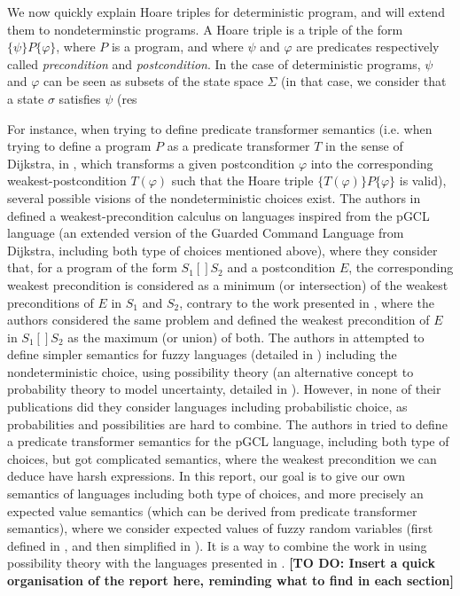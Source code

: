\documentclass[a4paper,10pt]{llncs}
\newcommand\todo[1]{{\color{red}\textbf{[TO DO:  #1]}}}
\newcommand\temp[1]{{\color{temp} #1}}
\begin{document}
We now quickly explain Hoare triples for deterministic program, and will extend them to nondeterminstic programs. A Hoare triple is a triple of the form $\{\psi\}P\{\varphi\}$, where $P$ is a program, and where $\psi$ and $\varphi$ are predicates respectively called \emph{precondition} and \emph{postcondition}. In the case of deterministic programs, $\psi$ and $\varphi$ can be seen as subsets of the state space $\Sigma$ (in that case, we consider that a state $\sigma$ satisfies $\psi$ (res

\temp{
For instance, when trying to define predicate transformer semantics (i.e. when trying to define a program $P$ as a predicate transformer $T$ in the sense of Dijkstra, in \cite{Dijkstra76}, which transforms a given postcondition $\varphi$ into the corresponding weakest-postcondition $T(\varphi)$ such that the Hoare triple $\{T(\varphi)\}P\{\varphi\}$ is valid), several possible visions of the nondeterministic choices exist. The authors in \cite{McIver05,WuChen11} defined a weakest-precondition calculus on languages inspired from the pGCL language (an extended version of the Guarded Command Language from Dijkstra, including both type of choices mentioned above), where they consider that, for a program of the form $S_1 [\!] S_2$ and a postcondition $E$, the corresponding weakest precondition is considered as a minimum (or intersection) of the weakest preconditions of $E$ in $S_1$ and $S_2$, contrary to the work presented in \cite{WuChen08,WuChen12}, where the authors considered the same problem and defined the weakest precondition of $E$ in $S_1 [\!] S_2$ as the maximum (or union) of both.\newline
The authors in \cite{WuChen08,WuChen11,WuChen12} attempted to define simpler semantics for fuzzy languages (detailed in \cite{Bueno93,Bueno97}) including the nondeterministic choice, using possibility theory (an alternative concept to probability theory to model uncertainty, detailed in \cite{Agarwal15,Shapiro09}). However, in none of their publications did they consider languages including probabilistic choice, as probabilities and possibilities are hard to combine. The authors in \cite{McIver05} tried to define a predicate transformer semantics for the pGCL language, including both type of choices, but got complicated semantics, where the weakest precondition we can deduce have harsh expressions.\newline
In this report, our goal is to give our own semantics of languages including both type of choices, and more precisely an expected value semantics (which can be derived from predicate transformer semantics), where we consider expected values of fuzzy random variables (first defined in \cite{PuriRal86}, and then simplified in \cite{Shapiro09}). It is a way to combine the work in \cite{WuChen08,WuChen11,WuChen12} using possibility theory with the languages presented in \cite{McIver05}.\newline
\todo{Insert a quick organisation of the report here, reminding what to find in each section}
}
\end{document}
